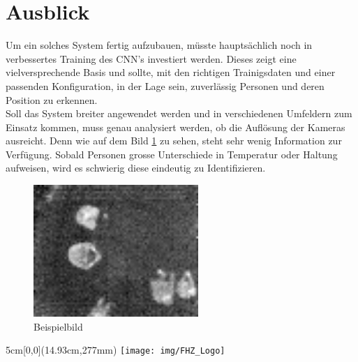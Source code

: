 \documentclass[
	a4paper
]{scrartcl}
\begin{document}
\section{Ausblick}
Um ein solches System fertig aufzubauen, müsste hauptsächlich noch in verbessertes Training des CNN's investiert werden. Dieses zeigt eine vielversprechende Basis und sollte, mit den richtigen Trainigsdaten und einer passenden Konfiguration, in der Lage sein, zuverlässig Personen und deren Position zu erkennen.\\
Soll das System breiter angewendet werden und in verschiedenen Umfeldern zum Einsatz kommen, muss genau analysiert werden, ob die Auflösung der Kameras ausreicht. Denn wie auf dem Bild \ref{fig:irexample} zu sehen, steht sehr wenig Information zur Verfügung. Sobald Personen grosse Unterschiede in Temperatur oder Haltung aufweisen, wird es schwierig diese eindeutig zu Identifizieren.

\begin{figure}[H]
	\centering
	\includegraphics[height=5cm]{exampleIRImage}
	\caption{Beispielbild}
	\label{fig:irexample}
\end{figure}

\vspace{0.5em}
\noindent
\begin{textblock*}{5cm}[0,0](14.93cm,277mm)
	\texttt{[image: img/FHZ\_Logo]}
\end{textblock*}
\end{document}
